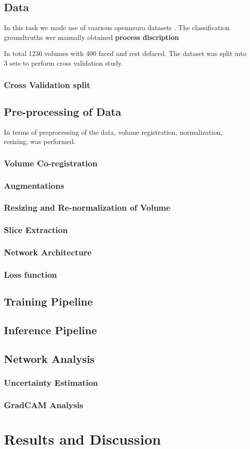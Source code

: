 \documentclass[runningheads]{llncs}
\begin{document}
\subsection{Data}
In this task we made use of vaarious openneuro datasets \cite{}. The classification groundtruths wer manually obtained \textbf{process discription}  

In total 1236 volumes with 400 faced and rest defaced. The dataset was split into 3 sets to perform cross validation study. 
\subsubsection{Cross Validation split}

\subsection{Pre-processing of Data}
In terms of preprocessing of the data, volume registration, normalization, resizing, was performed.

\subsubsection{Volume Co-registration}
\subsubsection{Augmentations}
\subsubsection{Resizing and Re-normalization of Volume}
\subsubsection{Slice Extraction}
\subsubsection{Network Architecture}
\subsubsection{Loss function}

\subsection{Training Pipeline}
\subsection{Inference Pipeline}

\subsection{Network Analysis}
\subsubsection{Uncertainty Estimation}
\subsubsection{GradCAM Analysis}


\newpage
\section{Results and Discussion}
\end{document}
